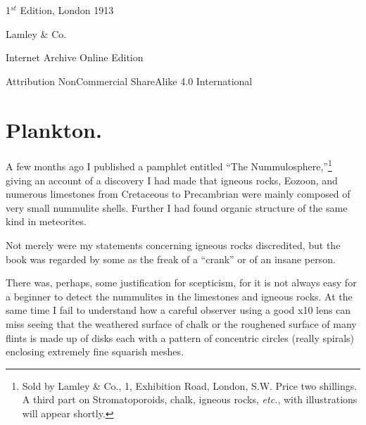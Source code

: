 \documentclass[a4paper, 12pt, oneside]{article}
\begin{document}
\begin{titlepage}
	
		
	\vspace*{\fill}%
	
	1$^{st}$ Edition, London 1913 %
	
	{\small Lamley \& Co. } %

	\vspace{1\baselineskip} %

    Internet Archive Online Edition  %
	
	{\small Attribution NonCommercial ShareAlike 4.0 International } %
\end{titlepage}
\setlength{\parskip}{1mm plus1mm minus1mm}
\setcounter{tocdepth}{3}
\setcounter{secnumdepth}{3}
\tableofcontents
\clearpage
\section{Plankton.}
\paragraph{}
A few months ago I published a pamphlet entitled ``The Nummulosphere,''\footnote{Sold by Lamley \& Co., 1, Exhibition Road, London, S.W. Price two shillings. A third part on Stromatoporoids, chalk, igneous rocks, \emph{etc.}, with illustrations will appear shortly.} giving an account of a discovery I had made that igneous rocks, Eozoon, and numerous limestones from Cretaceous to Precambrian were mainly composed of very small nummulite shells. Further I had found organic structure of the same kind in meteorites.

Not merely were my statements concerning igneous rocks discredited, but the book was regarded by some as the freak of a ``crank'' or of an insane person.

There was, perhaps, some justification for scepticism, for it is not always easy for a beginner to detect the nummulites in the limestones and igneous rocks. At the same time I fail to understand how a careful observer using a good x10 lens can miss seeing that the weathered surface of chalk or the roughened surface of many flints is made up of disks each with a pattern of concentric circles (really spirals) enclosing extremely fine squarish meshes.
\end{document}
